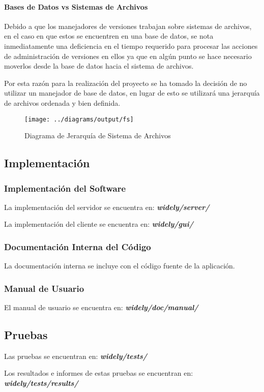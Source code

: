 \paragraph{Bases de Datos vs Sistemas de Archivos}

Debido a que los manejadores de versiones trabajan sobre sistemas de archivos, en el caso en que estos se encuentren en una base de datos, se nota inmediatamente una deficiencia en el tiempo requerido para procesar las acciones de administración de versiones en ellos ya que en algún punto se hace necesario moverlos desde la base de datos hacia el sistema de archivos.

Por esta razón para la realización del proyecto se ha tomado la decisión de no utilizar un manejador de base de datos, en lugar de esto se utilizará una jerarquía de archivos ordenada y bien definida.


\begin{figure}
 \centering
 \texttt{[image: ../diagrams/output/fs]}
 \caption{Diagrama de Jerarquía de Sistema de Archivos}
 \label{diagrama:fs}
\end{figure}


\newpage

\subsection{Implementación}


\subsubsection{Implementación del Software}

La implementación del servidor se encuentra en: \textit{\textbf{widely/server/}}

La implementación del cliente se encuentra en: \textit{\textbf{widely/gui/}}


\subsubsection{Documentación Interna del Código}

La documentación interna se incluye con el código fuente de la aplicación.


\subsubsection{Manual de Usuario}

El manual de usuario se encuentra en: \textit{\textbf{widely/doc/manual/}}


\subsection{Pruebas}

Las pruebas se encuentran en: \textit{\textbf{widely/tests/}}

Los resultados e informes de estas pruebas se encuentran en: \textit{\textbf{widely/tests/results/}}

